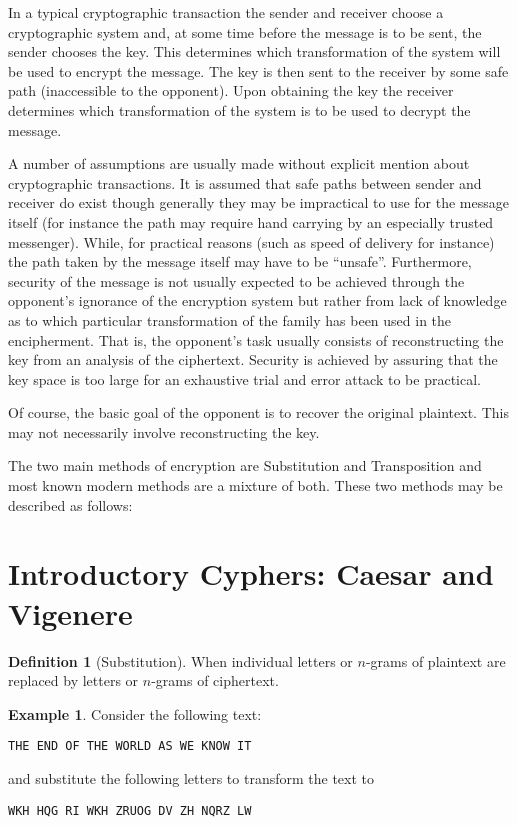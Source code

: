 \documentclass[11pt]{amsart}
\theoremstyle{definition}\newtheorem{definition}{Definition}
\theoremstyle{definition}\newtheorem{example}{Example}
\begin{document}
In a typical cryptographic transaction the sender and receiver choose a cryptographic system and, at some time before the message is to be sent, the sender chooses the key. This determines which transformation of the system will be used to encrypt the message. The key is then sent to the receiver by some safe path (inaccessible to the opponent). Upon obtaining the key the receiver determines which transformation of the system is to be used to decrypt the message.

A number of assumptions are usually made without explicit mention about cryptographic transactions. It is assumed that safe paths between sender and receiver do exist though generally they may be impractical to use for the message itself (for instance the path may require hand carrying by an especially trusted messenger). While, for practical reasons (such as speed of delivery for instance) the path taken by the message itself may have to be “unsafe”. Furthermore, security of the message is not usually expected to be achieved through the opponent's ignorance of the encryption system but rather from lack of knowledge as to which particular transformation of the family has been used in the encipherment. That is, the opponent's task usually consists of reconstructing the key from an analysis of the ciphertext. Security is achieved by assuring that the key space is too large for an exhaustive trial and error attack to be practical.

Of course, the basic goal of the opponent is to recover the original plaintext. This may not necessarily involve reconstructing the key.

The two main methods of encryption are Substitution and Transposition and most known modern methods are a mixture of both. These two methods may be described as follows:

\section{Introductory Cyphers: Caesar and Vigenere}

\begin{definition}[Substitution]
    When individual letters or $n$-grams of plaintext are replaced by letters or $n$-grams of ciphertext.
\end{definition}

\begin{example}
    Consider the following text:
    \begin{center}
        \verb|THE END OF THE WORLD AS WE KNOW IT|
    \end{center}
    and substitute the following letters to transform the text to
    \begin{center}
        \verb|WKH HQG RI WKH ZRUOG DV ZH NQRZ LW|
    \end{center}
\end{example}
\end{document}
